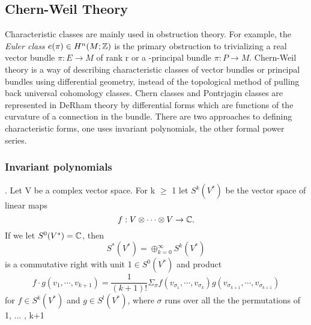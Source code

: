 \subsection{Chern-Weil Theory}
Characteristic classes are mainly used in obstruction theory. For example, the \textit{Euler class} $e(\pi) \in H^n(M;\mathbb{Z})$
is the primary obstruction to trivializing a real vector bundle $\pi:E \rightarrow M$ of rank r or a \Gl-principal bundle
$\pi:P \rightarrow M$. 
 Chern-Weil theory is a way of describing characteristic classes of vector bundles or principal bundles using differential
 geometry, instead of the topological method of pulling back universal cohomology classes. Chern
 classes and Pontrjagin classes are represented in DeRham theory by differential forms which are functions of
 the curvature of a connection in the bundle. There are two approaches to defining characteristic forms, one uses
 invariant polynomials, the other formal power series.
 \subsubsection{Invariant polynomials}. Let V be a complex vector space. For k $\geq$ 1 let $S^k(V^*)$ be the vector space
 of linear maps \begin{equation*}
                 f: V \otimes \cdots \otimes V \rightarrow \mathbb{C}.
                \end{equation*}
If we let $S^0(V^{*})= \mathbb{C}$, then
\begin{equation*}
 S^{*}(V^*) = \oplus_{k=0}^{\infty} S^k(V^*)
\end{equation*}
is a commutative right with unit 1$\in S^0(V^{*})$ and product 
\begin{equation*}
 f\cdot g (v_1 ,\cdots,v_{k+1}) = \dfrac{1}{(k+1)!} \Sigma_{\sigma} f(v_{\sigma_{1}}, \cdots, v_{\sigma_{k}})g(v_{\sigma_{k+1}},
 \cdots, v_{\sigma_{k+1}})
\end{equation*}
for $f \in S^{k}(V^{*})$ and $g \in S^{l}(V^{*})$, where $\sigma$ runs over all the the permutations of 1, ... , k+1
